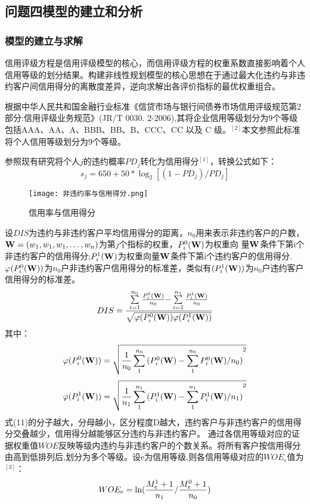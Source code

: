 \documentclass[12pt,a4paper]{nmmcm}
\begin{document}
\subsection{问题四模型的建立和分析}
\subsubsection{模型的建立与求解}
 信用评级方程是信用评级模型的核心，而信用评级方程的权重系数直接影响着个人信用等级的划分结果。构建非线性规划模型的核心思想在于通过最大化违约与非违约客户间信用得分的离散度差异，逆向求解出各评价指标的最优权重组合。
 
根据中华人民共和国金融行业标准《信贷市场与银行间债券市场信用评级规范第2部分:信用评级业务规范》(JR/T 0030. 2-2006),其将企业信用等级划分为9个等级包括AAA、AA、A、BBB、BB、B、CCC、CC 以及 C 级。$^{[2]}$本文参照此标准将个人信用等级划分为9个等级。
 
参照现有研究将个人$j$的违约概率$PD_{j}$转化为信用得分$^{[1]}$，转换公式如下：
\begin{equation}
{s_j} = 650 + 50*{\log _2}[(1 - P{D_j})/P{D_j}]
\end{equation}
\begin{figure}[b]
    \centering
    \texttt{[image: 非违约率与信用得分.png]}
    \label{fig:enter-label}
      \caption{信用率与信用得分}
\end{figure}
设$DIS$为违约与非违约客户平均信用得分的距离，$n_{0}$用来表示非违约客户的户数，${\bf{W}} = ({w_1},{w_1},{w_1}, \ldots ,{w_n})$为第$j$个指标的权重，$P_i^0({\bf{W}})$为权重向
量${\bf{W}}$条件下第i个非违约客户的信用得分;$P_i^1({\bf{W}})$为权重向量${\bf{W}}$条件下第i个违约客户的信用得分.$\varphi (P_i^0({\bf{W}}))$为$n_{0}$户非违约客户信用得分的标准差，类似有$(P_i^1({\bf{W}}))$为$n_{0}$户违约客户信用得分的标准差。
\begin{equation}
DIS = \frac{{\sum\limits_{i = 1}^{{n_0}} {\frac{{P_i^0({\bf{W}})}}{{{n_0}}} - } \sum\limits_{i = 1}^{{n_1}} {\frac{{P_i^1({\bf{W}})}}{{{n_0}}}} }}{{\sqrt {\varphi (P_i^0({\bf{W}}))\varphi (P_i^1({\bf{W}}))} }}
\end{equation}
其中：
\begin{equation}
\varphi (P_i^0({\bf{W}})) = \sqrt {\frac{1}{{{n_0}}}\sum\limits_1^{{n_0}} {{{(P_i^0({\bf{W}}) - \sum\limits_1^{{n_0}} {P_i^0({\bf{W}})/{n_0}} )}^2}} } 
\end{equation}
\begin{equation}
\varphi (P_i^1({\bf{W}})) = \sqrt {\frac{1}{{{n_1}}}\sum\limits_1^{{n_1}} {{{(P_i^1({\bf{W}}) - \sum\limits_1^{{n_1}} {P_i^1({\bf{W}})/{n_1}} )}^2}} } 
\end{equation}
式(11)的分子越大，分母越小，区分程度D越大，违约客户与非违约客户的信用得分交叠越少，信用得分越能够区分违约与非违约客户。
通过各信用等级对应的证据权重值$WOE$反映等级内违约与非违约客户的个数关系。将所有客户按信用得分由高到低排列后,划分为多个等级。设e为信用等级,则各信用等级对应的$WOE_{e}$值为$^{[3]}$：
\begin{equation}
WO{E_{\rm{e}}} = \ln (\frac{{M_e^1 + 1}}{{{n_1}}}/\frac{{M_e^0 + 1}}{{{n_0}}})
\end{equation}
\end{document}

